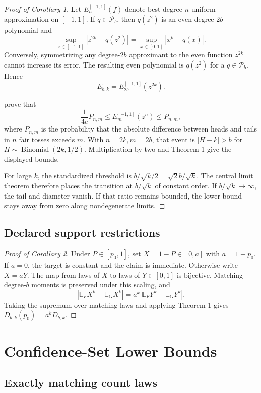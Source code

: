 \documentclass[twoside]{article}
\newcommand{\E}{\mathbb E}
\newcommand{\Pcal}{\mathcal P}
\begin{document}
\begin{proof}[Proof of Corollary 1]
Let \(E_n^{[-1,1]}(f)\) denote best degree-\(n\) uniform approximation on
\([-1,1]\). If \(q\in\Pcal_b\), then \(q(z^2)\) is an even degree-\(2b\)
polynomial and
\[
 \sup_{z\in[-1,1]}|z^{2k}-q(z^2)|
 =\sup_{x\in[0,1]}|x^k-q(x)|.
\]
Conversely, symmetrizing any degree-\(2b\) approximant to the even function
\(z^{2k}\) cannot increase its error. The resulting even polynomial is
\(q(z^2)\) for a \(q\in\Pcal_b\). Hence
\[
 E_{b,k}=E_{2b}^{[-1,1]}(z^{2k}).
\]

\citet{newman1976} prove that
\[
 \frac{1}{4e}P_{n,m}\leq E_m^{[-1,1]}(z^n)\leq P_{n,m},
\]
where \(P_{n,m}\) is the probability that the absolute difference between
heads and tails in \(n\) fair tosses exceeds \(m\). With \(n=2k,m=2b\),
that event is \(|H-k|>b\) for
\(H\sim\operatorname{Binomial}(2k,1/2)\). Multiplication by two and Theorem 1
give the displayed bounds.

For large \(k\), the standardized threshold is
\(b/\sqrt{k/2}=\sqrt{2}b/\sqrt{k}\). The central limit theorem therefore
places the transition at \(b/\sqrt{k}\) of constant order. If
\(b/\sqrt{k}\to\infty\), the tail and diameter vanish. If that ratio remains
bounded, the lower bound stays away from zero along nondegenerate limits.
\end{proof}

\subsection{Declared support restrictions}

\begin{proof}[Proof of Corollary 2]
Under \(P\in[p_0,1]\), set \(X=1-P\in[0,a]\) with \(a=1-p_0\). If \(a=0\),
the target is constant and the claim is immediate. Otherwise write \(X=aY\).
The map from laws of \(X\) to laws of \(Y\in[0,1]\) is bijective. Matching
degree-\(b\) moments is preserved under this scaling, and
\[
 \left|\E_FX^k-\E_GX^k\right|
 =a^k\left|\E_FY^k-\E_GY^k\right|.
\]
Taking the supremum over matching laws and applying Theorem 1 gives
\(D_{b,k}(p_0)=a^kD_{b,k}\).
\end{proof}

\section{Confidence-Set Lower Bounds}

\subsection{Exactly matching count laws}
\end{document}
